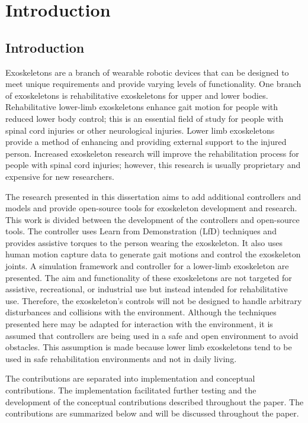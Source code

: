 \chapter{Introduction}
\section{Introduction}
Exoskeletons are a branch of wearable robotic devices that can be designed to meet unique requirements and provide varying levels of functionality. One branch of exoskeletons is rehabilitative exoskeletons for upper and lower bodies. Rehabilitative lower-limb exoskeletons enhance gait motion for people with reduced lower body control; this is an essential field of study for people with spinal cord injuries or other neurological injuries. Lower limb exoskeletons provide a method of enhancing and providing external support to the injured person. Increased exoskeleton research will improve the rehabilitation process for people with spinal cord injuries; however, this research is usually proprietary and expensive for new researchers.

The research presented in this dissertation aims to add additional controllers and models and provide open-source tools for exoskeleton development and research. This work is divided between the development of the controllers and open-source tools. The controller uses Learn from Demonstration (LfD) techniques and provides assistive torques to the person wearing the exoskeleton. It also uses human motion capture data to generate gait motions and control the exoskeleton joints. A simulation framework and controller for a lower-limb exoskeleton are presented. The aim and functionality of these exoskeletons are not targeted for assistive, recreational, or industrial use but instead intended for rehabilitative use. Therefore, the exoskeleton's controls will not be designed to handle arbitrary disturbances and collisions with the environment. Although the techniques presented here may be adapted for interaction with the environment, it is assumed that controllers are being used in a safe and open environment to avoid obstacles. This assumption is made because lower limb exoskeletons tend to be used in safe rehabilitation environments and not in daily living.

The contributions are separated into implementation and conceptual contributions. The implementation facilitated further testing and the development of the conceptual contributions described throughout the paper. The contributions are summarized below and will be discussed throughout the paper. 

